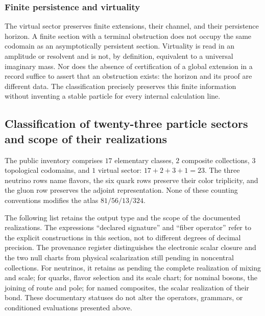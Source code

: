 \subsubsection{Finite persistence and virtuality}

The virtual sector preserves finite extensions, their channel, and their
persistence horizon. A finite section with a terminal obstruction does not occupy
the same codomain as an asymptotically persistent section. Virtuality
is read in an amplitude or resolvent and is not, by
definition, equivalent to a universal imaginary mass. Nor does the absence of
certification of a global extension in a record suffice to assert that
an obstruction exists: the horizon and its proof are different data.
The classification precisely preserves this finite information without
inventing a stable particle for every internal calculation line.

\subsection{Classification of twenty-three particle sectors and scope of their realizations}
\label{vi:subsec:23-clases}

The public inventory comprises \(17\) elementary classes, \(2\) composite
collections, \(3\) topological codomains, and \(1\) virtual sector:
\(17+2+3+1=23\). The three neutrino rows name flavors, the
six quark rows preserve their color triplicity, and the gluon row
preserves the adjoint representation. None of these counting
conventions modifies the atlas \(81/56/13/324\).

The following list retains the output type and the scope of the
documented realizations. The expressions “declared signature” and
“fiber operator” refer to the explicit constructions in this
section, not to different degrees of decimal precision.
The provenance register distinguishes the electronic scalar closure and
the two null charts from physical scalarization still pending in
noncentral collections. For neutrinos, it retains as pending the
complete realization of mixing and scale; for quarks, flavor selection
and its scale chart; for nominal bosons, the joining of route
and pole; for named composites, the scalar realization of their
bond. These documentary statuses do not alter the operators,
grammars, or conditioned evaluations presented above.

